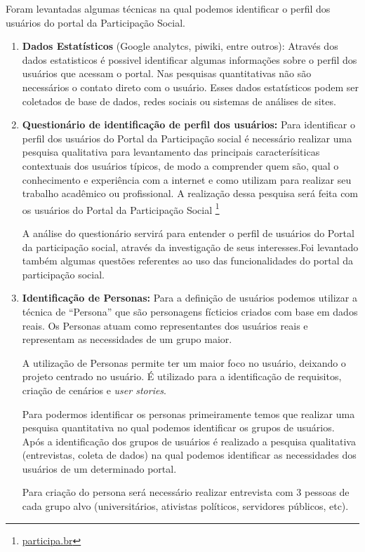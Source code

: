 	Foram levantadas algumas técnicas na qual podemos identificar o perfil dos usuários do portal da Participação Social.
\begin{enumerate}
\item \textbf{Dados Estatísticos} (Google analytcs, piwiki, entre outros): Através dos dados estatisticos é possivel identificar algumas informações sobre o perfil dos usuários que acessam o portal. Nas pesquisas quantitativas não são necessários o contato direto com o usuário. Esses dados estatísticos podem ser coletados de base de dados, redes sociais ou sistemas de análises de sites.

\item \textbf{Questionário de identificação de perfil dos usuários:} Para identificar o perfil dos usuários do Portal da Participação social é necessário realizar uma pesquisa qualitativa para levantamento das principais caracterísiticas contextuais dos usuários típicos, de modo a comprender quem são, qual o conhecimento e experiência com a internet e como utilizam para realizar seu trabalho acadêmico ou profissional. A realização dessa pesquisa será feita com os usuários do Portal da Participação Social \footnote{\url{participa.br}}

A análise do questionário servirá para entender o perfil de usuários do Portal da participação social, através da investigação de seus interesses.Foi levantado também algumas questões referentes ao uso das funcionalidades do portal da participação social.


\item \textbf{Identificação de Personas:} Para a definição de usuários podemos utilizar a técnica de “Persona” que são personagens fícticios criados com base em dados reais. Os Personas atuam como representantes dos usuários reais e representam as necessidades de um grupo maior. 

	A utilização de Personas permite ter um maior foco no usuário, deixando o projeto centrado no usuário. É utilizado para a identificação de requisitos, criação de cenários e \textit{user stories}. 

	Para podermos identificar os personas primeiramente temos que realizar uma pesquisa quantitativa no qual podemos identificar os grupos de usuários. Após a identificação dos grupos de usuários é realizado a pesquisa qualitativa (entrevistas, coleta de dados) na qual podemos identificar as necessidades dos usuários de um determinado portal.

	Para criação do persona será necessário realizar entrevista com 3 pessoas de cada grupo alvo (universitários, ativistas políticos, servidores públicos, etc).

\end{enumerate}

